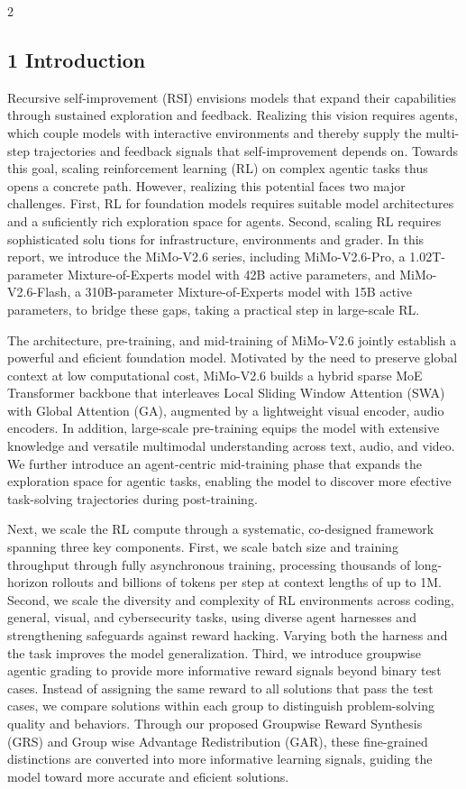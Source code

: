 \documentclass[
  10
]{article}
\begin{document}
2

\subsection{1 Introduction}\label{introduction}

Recursive self-improvement (RSI) envisions models that expand their
capabilities through sustained exploration and feedback. Realizing this
vision requires agents, which couple models with interactive
environments and thereby supply the multi-step trajectories and feedback
signals that self-improvement depends on. Towards this goal, scaling
reinforcement learning (RL) on complex agentic tasks thus opens a
concrete path. However, realizing this potential faces two major
challenges. First, RL for foundation models requires suitable model
architectures and a suficiently rich exploration space for agents.
Second, scaling RL requires sophisticated solu tions for infrastructure,
environments and grader. In this report, we introduce the MiMo-V2.6
series, including MiMo-V2.6-Pro, a 1.02T-parameter Mixture-of-Experts
model with 42B active parameters, and MiMo-V2.6-Flash, a 310B-parameter
Mixture-of-Experts model with 15B active parameters, to bridge these
gaps, taking a practical step in large-scale RL.

The architecture, pre-training, and mid-training of MiMo-V2.6 jointly
establish a powerful and eficient foundation model. Motivated by the
need to preserve global context at low computational cost, MiMo-V2.6
builds a hybrid sparse MoE Transformer backbone that interleaves Local
Sliding Window Attention (SWA) with Global Attention (GA), augmented by
a lightweight visual encoder, audio encoders. In addition, large-scale
pre-training equips the model with extensive knowledge and versatile
multimodal understanding across text, audio, and video. We further
introduce an agent-centric mid-training phase that expands the
exploration space for agentic tasks, enabling the model to discover more
efective task-solving trajectories during post-training.

Next, we scale the RL compute through a systematic, co-designed
framework spanning three key components. First, we scale batch size and
training throughput through fully asynchronous training, processing
thousands of long-horizon rollouts and billions of tokens per step at
context lengths of up to 1M. Second, we scale the diversity and
complexity of RL environments across coding, general, visual, and
cybersecurity tasks, using diverse agent harnesses and strengthening
safeguards against reward hacking. Varying both the harness and the task
improves the model generalization. Third, we introduce groupwise agentic
grading to provide more informative reward signals beyond binary test
cases. Instead of assigning the same reward to all solutions that pass
the test cases, we compare solutions within each group to distinguish
problem-solving quality and behaviors. Through our proposed Groupwise
Reward Synthesis (GRS) and Group wise Advantage Redistribution (GAR),
these fine-grained distinctions are converted into more informative
learning signals, guiding the model toward more accurate and eficient
solutions.
\end{document}
